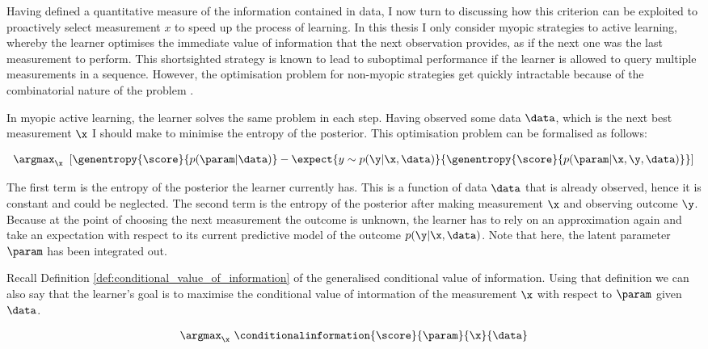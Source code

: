 Having defined a quantitative measure of the information contained in data, I now turn to discussing how this criterion can be exploited to proactively select measurement $x$ to speed up the process of learning. In this thesis I only consider myopic strategies to active learning, whereby the learner optimises the immediate value of information that the next observation provides, as if the next one was the last measurement to perform. This shortsighted strategy is known to lead to suboptimal performance if the learner is allowed to query multiple measurements in a sequence. However, the optimisation problem for non-myopic strategies get quickly intractable because of the combinatorial nature of the problem \citep{Krause2007}.

In myopic active learning, the learner solves the same problem in each step. Having observed some data $\data$, which is the next best measurement $\x$ I should make to minimise the entropy of the posterior. This optimisation problem can be formalised as follows:

\begin{equation}
	\argmax_\x\ \left[ \genentropy{\score}{p(\param\vert\data)} - \expect{y\sim p(\y\vert \x, \data)}{\genentropy{\score}{p(\param\vert \x,\y,\data)} }\right ]
	\label{eqn:active_learning_optimisation_criterion}
\end{equation}

The first term is the entropy of the posterior the learner currently has. This is a function of data $\data$ that is already observed, hence it is constant and could be neglected. The second term is the entropy of the posterior after making measurement $\x$ and observing outcome $\y$. Because at the point of choosing the next measurement the outcome is unknown, the learner has to rely on an approximation again and take an expectation with respect to its current predictive model of the outcome $p(\y \vert \x, \data)$. Note that here, the latent parameter $\param$ has been integrated out.

Recall Definition \ref{def:conditional_value_of_information} of the generalised conditional value of information. Using that definition we can also say that the learner's goal is to maximise the conditional value of intormation of the measurement $\x$ with respect to $\param$ given $\data$.

\begin{equation}
	\argmax_\x\ \conditionalinformation{\score}{\param}{\x}{\data}
\end{equation}

